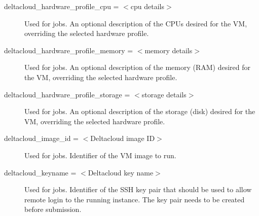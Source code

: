 \begin{description}

\label{condor-submit-deltacloud-hardware-profile-cpu}
\item[deltacloud\_hardware\_profile\_cpu = $<$cpu details$>$]
Used for  jobs.
An optional description of the CPUs desired for the VM, overriding
the selected hardware profile.


\label{condor-submit-deltacloud-hardware-profile-memory}
\item[deltacloud\_hardware\_profile\_memory = $<$memory details$>$]
Used for  jobs.
An optional description of the memory (RAM) desired for the VM, overriding
the selected hardware profile.


\label{condor-submit-deltacloud-hardware-profile-storage}
\item[deltacloud\_hardware\_profile\_storage = $<$storage details$>$]
Used for  jobs.
An optional description of the storage (disk) desired for the VM, overriding
the selected hardware profile.


\label{condor-submit-deltacloud-image-id}
\item[deltacloud\_image\_id = $<$Deltacloud image ID$>$]
Used for  jobs.
Identifier of the VM image to run.


\label{condor-submit-deltacloud-keyname}
\item[deltacloud\_keyname = $<$Deltacloud key name$>$]
Used for  jobs.
Identifier of the SSH key pair that should be used to allow remote login
to the running instance. The key pair needs to be created before
submission.



\end{description}
